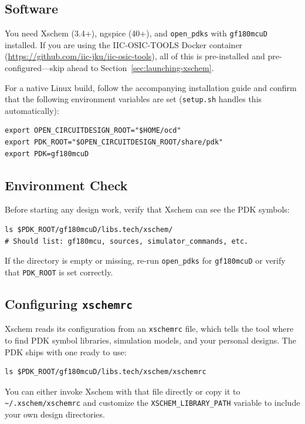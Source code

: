 \documentclass[11pt]{article}
\begin{document}
\subsection{Software}

You need Xschem (3.4+), ngspice (40+), and \texttt{open\_pdks} with
\texttt{gf180mcuD} installed.
If you are using the IIC-OSIC-TOOLS Docker container
(\url{https://github.com/iic-jku/iic-osic-tools}), all of this is
pre-installed and pre-configured---skip ahead to
Section~\ref{sec:launching-xschem}.

For a native Linux build, follow the accompanying installation guide
and confirm that the following environment variables are set
(\texttt{setup.sh} handles this automatically):

\begin{lstlisting}
export OPEN_CIRCUITDESIGN_ROOT="$HOME/ocd"
export PDK_ROOT="$OPEN_CIRCUITDESIGN_ROOT/share/pdk"
export PDK=gf180mcuD
\end{lstlisting}

\subsection{Environment Check}

Before starting any design work, verify that Xschem can see the PDK
symbols:

\begin{lstlisting}
ls $PDK_ROOT/gf180mcuD/libs.tech/xschem/
# Should list: gf180mcu, sources, simulator_commands, etc.
\end{lstlisting}

If the directory is empty or missing, re-run \texttt{open\_pdks} for
\texttt{gf180mcuD} or verify that \texttt{PDK\_ROOT} is set correctly.

\subsection{Configuring \texttt{xschemrc}}

Xschem reads its configuration from an \texttt{xschemrc} file, which
tells the tool where to find PDK symbol libraries, simulation models,
and your personal designs.
The PDK ships with one ready to use:

\begin{lstlisting}
ls $PDK_ROOT/gf180mcuD/libs.tech/xschem/xschemrc
\end{lstlisting}

You can either invoke Xschem with that file directly or copy it to
\texttt{\textasciitilde/.xschem/xschemrc} and customize the
\texttt{XSCHEM\_LIBRARY\_PATH} variable to include your own design
directories.
\end{document}
